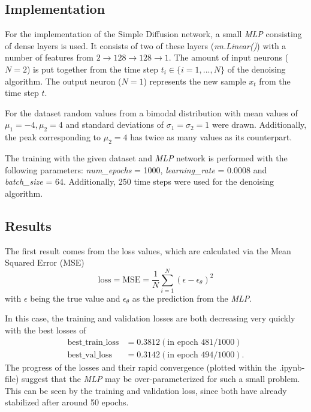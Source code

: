 

\setlength{\parindent}{0em}



\subsection{Implementation}
For the implementation of the Simple Diffusion network, a small \textit{MLP} consisting of dense layers is used. 
It consists of two of these layers (\textit{nn.Linear()}) with a number of features from $2 \rightarrow 128 \rightarrow 128 \rightarrow 1$.
The amount of input neurons ($N = 2$) is put together from the time step $t_i \in \{i = 1, ..., N\}$ of the denoising algorithm.
The output neuron ($N = 1$) represents the new sample $x_t$ from the time step $t$.

For the dataset random values from a bimodal distribution with mean values of $\mu_1 = -4, \mu_2 = 4$ and standard deviations of $\sigma_1 = \sigma_2 = 1$ were drawn.
Additionally, the peak corresponding to $\mu_2 = 4$ has twice as many values as its counterpart.

The training with the given dataset and \textit{MLP} network is performed with the following parameters: 
\textit{num\_epochs} = 1000, \textit{learning\_rate} = 0.0008 and \textit{batch\_size} = 64.
Additionally, 250 time steps were used for the denoising algorithm.

\subsection{Results}
The first result comes from the loss values, which are calculated via the Mean Squared Error (MSE)
$$
\nonumber
\text{loss} = \text{MSE} = \frac{1}{N} \sum_{i=1}^{N}\left(\epsilon - \epsilon_\theta\right)^2
$$
with $\epsilon$ being the true value and $\epsilon_\theta$ as the prediction from the \textit{MLP}.

In this case, the training and validation losses are both decreasing very quickly with the best losses of
\begin{align*}
  \text{best\_train\_loss} &= 0.3812 (\text{in epoch 481/1000})\\
  \text{best\_val\_loss} &= 0.3142 (\text{in epoch 494/1000}).
\end{align*}
The progress of the losses and their rapid convergence (plotted within the .ipynb-file) suggest that the \textit{MLP} may be over-parameterized for such a small problem.
This can be seen by the training and validation loss, since both have already stabilized after around 50 epochs.


